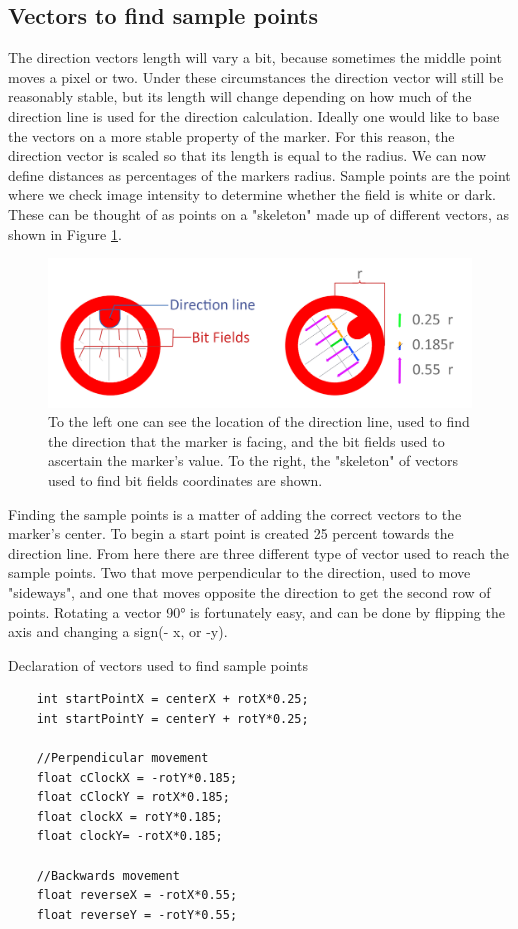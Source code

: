 \subsection{Vectors to find sample points}
The direction vectors length will vary a bit, because sometimes the middle point moves a pixel or two. Under these circumstances the direction vector will still be reasonably stable, but its length will change depending on how much of the direction line is used for the direction calculation. Ideally one would like to base the vectors on a more stable property of the marker. For this reason, the direction vector is scaled so that its length is equal to the radius. We can now define distances as percentages of the markers radius. Sample points are the point where we check image intensity to determine whether the field is white or dark. These can be thought of as points on a "skeleton" made up of different vectors, as shown in Figure \ref{fig:vector}.
\begin{figure}
	\centering
	\includegraphics[width=1\linewidth]{figure/Analysis/vector.png}
	\caption{To the left one can see the location of the direction line, used to find the direction that the marker is facing, and the bit fields used to ascertain the marker's value. To the right, the "skeleton" of vectors used to find bit fields coordinates are shown.} 
	\label{fig:vector}
\end{figure}
Finding the sample points is a matter of adding the correct vectors to the marker's center. To begin a start point is created 25 percent towards the direction line. From here there are three different type of vector used to reach the sample points. Two that move perpendicular to the direction, used to move "sideways", and one that moves opposite the direction to get the second row of points. Rotating a vector 90° is fortunately easy, and can be done by flipping the axis and changing a sign(- x, or -y).    
\begin{listing}[H]
	\caption{Declaration of vectors used to find sample points}
	\begin{verbatim}
	int startPointX = centerX + rotX*0.25;
	int startPointY = centerY + rotY*0.25;
	
	//Perpendicular movement
	float cClockX = -rotY*0.185;
	float cClockY = rotX*0.185;
	float clockX = rotY*0.185;
	float clockY= -rotX*0.185;
	
	//Backwards movement
	float reverseX = -rotX*0.55;
	float reverseY = -rotY*0.55;
	\end{verbatim}
	\label{listing:vectors}
\end{listing}
